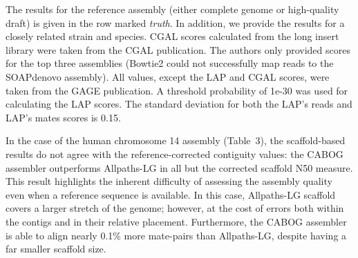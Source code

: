 \documentclass[12pt,\mydriver]{thesis}
\begin{document}
\begin{landscape}
\begin{table}[tb!]
{The results for the reference
assembly (either complete genome or high-quality draft) is given in the row
marked \emph{truth}.  In addition, we
provide the results for a closely related strain and species.
CGAL scores calculated from the long insert library were taken from the CGAL publication.
The authors only provided scores for the top three assemblies (Bowtie2 could not successfully map reads to the SOAPdenovo assembly).
All values, except the LAP and CGAL scores, were taken from the
GAGE publication. A threshold probability of 1e-30 was used for calculating the LAP scores. The standard deviation for both the LAP's reads and LAP's mates scores is 0.15.}
\label{tab:hg14}
\end{table}

\renewcommand{\baselinestretch}{2}
\small\normalsize
\end{landscape}


In the case of the human chromosome 14 assembly (Table~3), the scaffold-based
results do not agree with the reference-corrected contiguity values: the CABOG assembler outperforms Allpaths-LG in all but the
corrected scaffold N50 measure. This result highlights the inherent
difficulty of assessing the assembly quality even when a reference
sequence is available.  In this case, Allpaths-LG scaffold covers a
larger stretch of the genome; however, at the cost of errors both within the
contigs and in their relative placement.
Furthermore, the CABOG assembler is able to align nearly 0.1\% more mate-pairs than Allpaths-LG, despite having a far smaller scaffold size.
\end{document}
